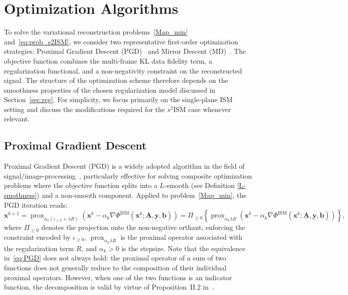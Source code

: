 \documentclass[letterpaper]{article}
\newcommand{\x}{\mathbf{x}}
\begin{document}
\section{Optimization Algorithms}
\label{sec:algorithms}



To solve the variational reconstruction problems~\eqref{Map_min} and~\eqref{eq:prob_s2ISM}, we consider two representative first-order optimization strategies: Proximal Gradient Descent (PGD)~\cite{proximal_gd} and Mirror Descent (MD)~\cite{nemirovskii_yudin_1983}. The objective function combines the multi-frame KL  data fidelity term, a regularization functional, and a non-negativity constraint on the reconstructed signal. The structure of the optimization scheme therefore depends on the smoothness properties of the chosen regularization model discussed in Section~\ref{sec:reg}. For simplicity, we focus primarily on the single-plane ISM setting and discuss the modifications required for the $s^2$ISM case whenever relevant.


\subsection{Proximal Gradient Descent}
\label{sec:PGD}

Proximal Gradient Descent (PGD) is a widely adopted algorithm in the field of signal/image-processing~\cite{proximal_gd,beck}, particularly effective 
for solving composite optimization problems where the objective function splits into a $L$-smooth (see Definition \ref{L-smothness}) and a non-smooth component. Applied to problem~\eqref{Map_min}, the PGD iteration reads:
\begin{equation}
\label{eq:PGD}
\tag{PGD}
    \x^{k+1} = \operatorname{prox}_{\alpha_k (\iota_{\geq 0} + \lambda R)} 
    \left( \x^k - \alpha_k \nabla \Phi^{\text{ISM}} (\x^k; \underline{\mathbf{A}},
    \underline{\mathbf{y}}, \underline{\mathbf b}) \right) 
    = \Pi_{\geq 0} \left\{ \operatorname{prox}_{\alpha_k \lambda R} 
    \left( \x^k - \alpha_k \nabla \Phi^{\text{ISM}} (\x^k; \underline{\mathbf{A}},
    \underline{\mathbf{y}}, \underline{\mathbf{b}}) \right) \right\},
\end{equation}
where $\Pi_{\geq 0}$ denotes the projection onto the non-negative orthant, enforcing the 
constraint encoded by $\iota_{\geq 0}$, $\operatorname{prox}_{\alpha_k \lambda R}$ is the 
proximal operator associated with the regularization term $R$, and $\alpha_k > 0$ is the stepsize. Note that the equivalence in~\eqref{eq:PGD} does not always hold: the proximal operator of a sum of two functions does not generally reduce to the composition of their individual proximal operators. However, 
when one of the two functions is an indicator function, the decomposition is valid by virtue of 
Proposition~II.2 in~\cite{sum_of_prox}.
\end{document}
